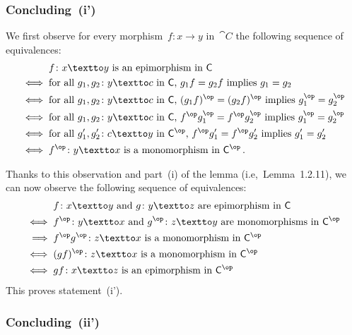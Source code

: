 \subsubsection*{Concluding~(i')}

We first observe for every morphism~$f \colon x \to y$ in~$\cat{C}$ the following sequence of equivalences:
\begin{align*}
	{}&
	\text{$f \colon x \textto y$ is an epimorphism in~$\cat{C}$}
	\\
	\iff{}&
	\text{for all~$g_1, g_2 \colon y \textto c$ in~$\cat{C}$,~$g_1 f = g_2 f$ implies~$g_1 = g_2$}
	\\
	\iff{}&
	\text{for all~$g_1, g_2 \colon y \textto c$ in~$\cat{C}$,~$(g_1 f)^{\op} = (g_2 f)^{\op}$ implies~$g_1^{\op} = g_2^{\op}$}
	\\
	\iff{}&
	\text{for all~$g_1, g_2 \colon y \textto c$ in~$\cat{C}$,~$f^{\op} g_1^{\op} = f^{\op} g_2^{\op}$ implies~$g_1^{\op} = g_2^{\op}$}
	\\
	\iff{}&
	\text{for all~$g'_1, g'_2 \colon c \textto y$ in~$\cat{C}^{\op}$,~$f^{\op} g'_1 = f^{\op} g'_2$ implies~$g'_1 = g'_2$}
	\\
	\iff{}&
	\text{$f^{\op} \colon y \textto x$ is a monomorphism in~$\cat{C}^{\op}$} \,.
\end{align*}

Thanks to this observation and part~(i) of the lemma (i.e,~Lemma~1.2.11), we can now observe the following sequence of equivalences:
\begin{align*}
	{}&
	\text{$f \colon x \textto y$ and~$g \colon y \textto z$ are epimorphism in~$\cat{C}$}
	\\
	\iff{}&
	\text{$f^{\op} \colon y \textto x$ and~$g^{\op} \colon z \textto y$ are monomorphisms in~$\cat{C}^{\op}$}
	\\
	\implies{}&
	\text{$f^{\op} g^{\op} \colon z \textto x$ is a monomorphism in~$\cat{C}^{\op}$}
	\\
	\iff{}&
	\text{$(g f)^{\op} \colon z \textto x$ is a monomorphism in~$\cat{C}^{\op}$}
	\\
	\iff{}&
	\text{$g f \colon x \textto z$ is an epimorphism in~$\cat{C}^{\op}$}
\end{align*}
This proves statement~(i').



\subsubsection*{Concluding~(ii')}

